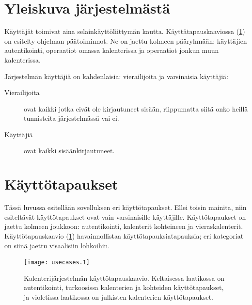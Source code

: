 \documentclass[a4paper,12pt]{report}
\begin{document}
\section{Yleiskuva järjestelmästä}
Käyttäjät toimivat aina selainkäyttöliittymän kautta. Käyttätapauskaaviossa
(\ref{graph_usecases}) on esitelty ohjelman päätoiminnot. Ne on jaettu kolmeen
pääryhmään: käyttäjien autentikointi, operaatiot omassa kalenterissa ja
operaatiot jonkun muun kalenterissa.

Järjestelmän käyttäjiä on kahdenlaisia: vierailijoita ja varsinaisia
käyttäjiä:
\begin{description}
   \item[Vierailijoita] ovat kaikki jotka eivät ole kirjautuneet sisään,
      riippumatta siitä onko heillä tunnisteita järjestelmässä vai ei.
   \item[Käyttäjiä] ovat kaikki sisäänkirjautuneet.
\end{description}

\section{Käyttötapaukset}
Tässä luvussa esitellään sovelluksen eri käyttötapaukset.  Ellei toisin mainita,
niin esiteltävät käyttö\-tapaukset ovat vain varsinaisille käyttäjille.
Käyttö\-tapaukset on jaettu kolmeen joukkoon: autentikointi, kalenterit
kohteineen ja vieraskalenterit.  Käyttö\-tapaus\-kaavio (\ref{graph_usecases})
havainnollistaa käyttötapauksiatapauksia; eri kategoriat on siinä jaettu
visaalisiin lohkoihin.
\begin{figure}[ht]
   \centering \texttt{[image: usecases.1]}
   \caption{Kalenterijärjestelmän käyttötapauskaavio.
      \textcolor[rgb]{0.5,0.5,0}{Keltaisessa} laatikossa on autentikointi,
      \textcolor[rgb]{0,0.5,0.5}{turkoosissa} kalenterien ja kohteiden
      käyttötapaukset, ja
      \textcolor[rgb]{0.5,0,0.5}{violetissa} laatikossa on julkisten kalenterien
      käyttötapaukset.
   }
   \label{graph_usecases}
\end{figure}
\end{document}
